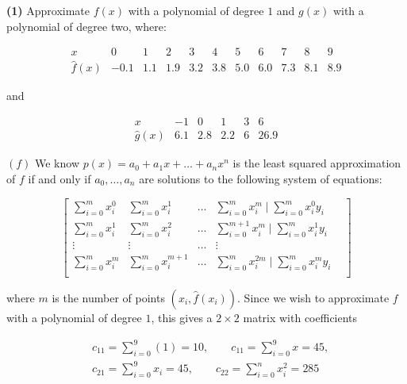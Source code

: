 \documentclass[12pt]{article}
\theoremstyle{definition}
\begin{document}
\begin{shaded}
    \textbf{(1)} Approximate $f(x)$ with a polynomial of degree $1$ and $g(x)$ with a
    polynomial of degree two, where: 

     \begin{equation*}
    \begin{array}{c|c|c|c|c|c|c|c|c|c|c}
        x & 0 & 1 & 2 & 3 & 4 & 5 & 6 & 7 & 8 & 9\\
        \hat{f}(x) & -0.1 & 1.1 & 1.9 & 3.2 & 3.8 & 5.0 & 6.0 & 7.3 & 8.1 & 8.9
     \end{array}
     \end{equation*}

     and 

     \begin{equation*}
    \begin{array}{c|c|c|c|c|c}
        x & -1 & 0 & 1 & 3 & 6\\ 
        \hat{g}(x) & 6.1 & 2.8 & 2.2 & 6 & 26.9
     \end{array}
     \end{equation*}

\end{shaded}

$(f)$ We know $p(x) = a_0 + a_1x + \ldots + a_nx^n$ is the least squared
approximation of $f$ if and only if $a_0, \ldots, a_n$ are solutions to the
following system of equations: 

\begin{equation*}
    \begin{bmatrix} 
        \sum_{i=0}^m x_i^0 & \sum_{i=0}^m x_i^1 & \ldots & \sum_{i=0}^m x_i^m
        \mid \sum_{i=0}^m x_i^0 y_i\\ 
        \sum_{i=0}^m x_i^1 & \sum_{i=0}^m x_i^2 & \ldots & \sum_{i=0}^{m+1} x_i^m
        \mid \sum_{i=0}^m x_i^1 y_i\\ 
        \vdots & \vdots & \ldots & \vdots & \\

        \sum_{i=0}^m x_i^m & \sum_{i=0}^m x_i^{m+1} & \ldots & \sum_{i=0}^m
        x_i^{2m}
        \mid \sum_{i=0}^m x_i^m y_i\\ 
    \end{bmatrix} 
\end{equation*}

where $m$ is the number of points $(x_i, \hat{f}(x_i))$. Since we wish to
approximate $f$ with a polynomial of degree $1$, this gives a $2\times 2$ matrix 
with coefficients

\begin{align*}
    &c_{11} = \sum_{i=0}^9 (1) = 10, \qquad c_{11} = \sum_{i=0}^9 x = 45, \\
    &c_{21} = \sum_{i=0}^9 x_i = 45, \qquad c_{22} = \sum_{i=0}^n x_i^2 = 285 
\end{align*}
\end{document}
